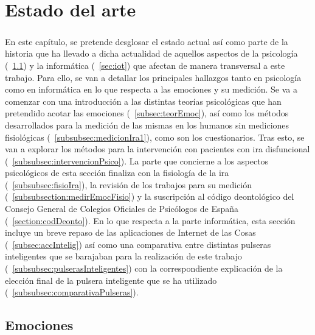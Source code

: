 %
%

\chapter{Estado del arte}

\paragraph{}
En este capítulo, se pretende desglosar el estado actual así como parte de la historia que ha llevado a dicha actualidad de aquellos aspectos de la psicología (~\ref{cap1:sec:Emociones}) y la informática (~\ref{sec:iot}) que afectan de manera transversal a este trabajo. Para ello, se van a detallar los principales hallazgos tanto en psicología como en informática en lo que respecta a las emociones y su medición. Se va a comenzar con una introducción a las distintas teorías psicológicas que han pretendido acotar las emociones (~\ref{subsec:teorEmoc}), así como los métodos desarrollados para la medición de las mismas en los humanos sin mediciones fisiológicas (~\ref{subsubsec:medicionIra1}), como son los cuestionarios. Tras esto, se van a explorar los métodos para la intervención con pacientes con ira disfuncional (~\ref{subsubsec:intervencionPsico}). La parte que concierne a los aspectos psicológicos de esta sección finaliza con la fisiología de la ira (~\ref{subsubsec:fisioIra}), la revisión de los trabajos para su medición (~\ref{subsubsection:medirEmocFisio}) y la suscripción al código deontológico del Consejo General de Colegios Oficiales de Psicólogos de España (~\ref{section:codDeonto}). En lo que respecta a la parte informática, esta sección incluye un breve repaso de las aplicaciones de Internet de las Cosas (~\ref{subsec:accIntelig}) así como una comparativa entre distintas pulseras inteligentes que se barajaban para la realización de este trabajo (~\ref{subsubsec:pulserasInteligentes}) con la correspondiente explicación de la elección final de la pulsera inteligente que se ha utilizado (~\ref{subsubsec:comparativaPulseras}).

\section{Emociones}
\label{cap1:sec:Emociones}

